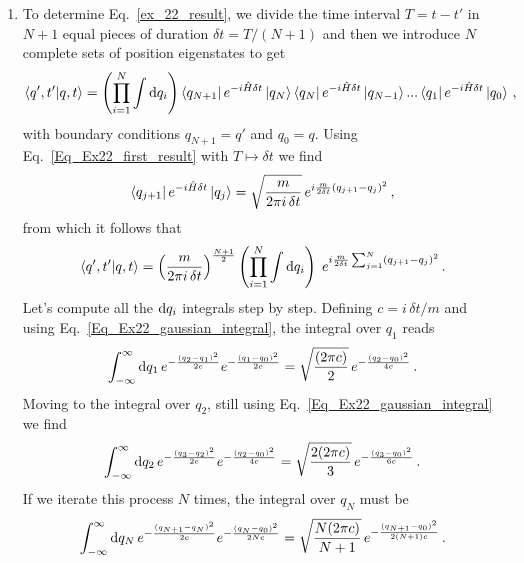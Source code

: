 \begin{sol}
\begin{enumerate}[label=\alph*)]
    \item To determine Eq.~\eqref{ex_22_result}, we divide the time interval $T = t-t'$ in $N+1$ equal pieces of duration $\delta t = T/(N+1)$ and then we introduce $N$ complete sets of position eigenstates to get
    \begin{align}
        \bra{q', t'}\ket{q, t} = \left(\prod_{i=1}^N \int {\rm d} q_i\right) \bra{q_{N+1}} e ^{-i \hat{H} \delta t} \ket{q_N} \bra{q_N} e ^{-i \hat{H} \delta t} \ket{q_{N-1}} ... \bra{q_1} e ^{-i \hat{H} \delta t} \ket{q_0} \,,
    \end{align}
    with boundary conditions $q_{N+1}=q'$ and $q_0=q$. Using Eq.~\eqref{Eq_Ex22_first_result} with $T \mapsto \delta t$ we find
    \begin{equation}
        \bra{q_{j+1}} e ^{-i \hat{H} \delta t} \ket{q_j} 
        = \sqrt{\frac{m}{2\pi i \, \delta t}} \, e^{i\frac{m}{2 \delta t} (q_{j+1} - q_j)^2} \, ,
    \end{equation}
    from which it follows that
    \begin{align}
    \label{integral_qj}
        \bra{q', t'}\ket{q, t} 
        =  \left(\frac{m}{2\pi i \, \delta t}\right)^{\frac{N+1}{2}} \left(\prod_{i=1}^N \int {\rm d} q_i\right) \;e^{i\frac{m}{2 \delta t} \sum_{j=1}^N\left(q_{j+1} - q_j\right)^2}\,.
    \end{align}
    Let's compute all the ${\rm d} q_i$ integrals step by step. Defining $c= i \, \delta t /m$ and using Eq.~\eqref{Eq_Ex22_gaussian_integral}, the integral over $q_1$ reads
    \begin{equation}
        \int_{-\infty}^\infty {\rm d} q_1 \, e^{-\frac{(q_2 - q_1)^2}{2c}} e^{-\frac{(q_1 - q_0)^2}{2c}} 
        = \sqrt{\frac{(2\pi c)}{2}} \, e^{-\frac{(q_2 - q_0)^2}{4c}}\,.
    \end{equation}
    Moving to the integral over $q_2$, still using Eq.~\eqref{Eq_Ex22_gaussian_integral} we find
    \begin{equation}
        \int_{-\infty}^\infty {\rm d} q_2 \, e^{-\frac{(q_3 - q_2)^2}{2c}} e^{-\frac{(q_2 - q_0)^2}{4c}} 
        = \sqrt{\frac{2(2\pi c)}{3}} \, e^{-\frac{(q_3 - q_0)^2}{6c}}\,.
    \end{equation}
    If we iterate this process $N$ times, the integral over $q_N$ must be 
    \begin{equation}
        \int_{-\infty}^\infty \rmd q_N \, e^{-\frac{(q_{N+1} - q_N)^2}{2c}} e^{-\frac{(q_N - q_0)^2}{2Nc}} 
        = \sqrt{\frac{N (2\pi c)}{N+1}} \, e^{-\frac{(q_{N+1} - q_0)^2}{2(N+1)c}}\,.

\end{equation}
\end{enumerate}
\end{sol}
